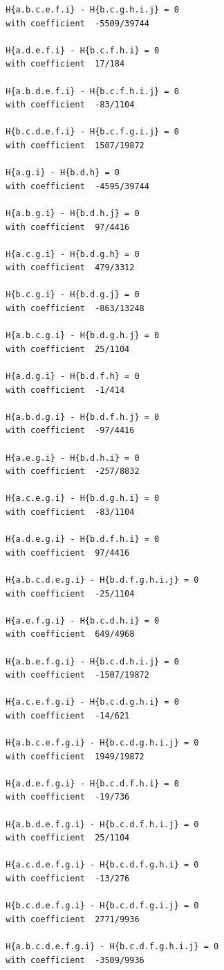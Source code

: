 \documentclass[11pt, a4paper]{kybernetika}
\begin{document}
\begin{verbatim}
		H{a.b.c.e.f.i} - H{b.c.g.h.i.j} = 0
		with coefficient  -5509/39744
		
		H{a.d.e.f.i} - H{b.c.f.h.i} = 0
		with coefficient  17/184
		
		H{a.b.d.e.f.i} - H{b.c.f.h.i.j} = 0
		with coefficient  -83/1104
		
		H{b.c.d.e.f.i} - H{b.c.f.g.i.j} = 0
		with coefficient  1507/19872
		
		H{a.g.i} - H{b.d.h} = 0
		with coefficient  -4595/39744
		
		H{a.b.g.i} - H{b.d.h.j} = 0
		with coefficient  97/4416
		
		H{a.c.g.i} - H{b.d.g.h} = 0
		with coefficient  479/3312
		
		H{b.c.g.i} - H{b.d.g.j} = 0
		with coefficient  -863/13248
		
		H{a.b.c.g.i} - H{b.d.g.h.j} = 0
		with coefficient  25/1104
		
		H{a.d.g.i} - H{b.d.f.h} = 0
		with coefficient  -1/414
		
		H{a.b.d.g.i} - H{b.d.f.h.j} = 0
		with coefficient  -97/4416
		
		H{a.e.g.i} - H{b.d.h.i} = 0
		with coefficient  -257/8832
		
		H{a.c.e.g.i} - H{b.d.g.h.i} = 0
		with coefficient  -83/1104
		
		H{a.d.e.g.i} - H{b.d.f.h.i} = 0
		with coefficient  97/4416
		
		H{a.b.c.d.e.g.i} - H{b.d.f.g.h.i.j} = 0
		with coefficient  -25/1104
		
		H{a.e.f.g.i} - H{b.c.d.h.i} = 0
		with coefficient  649/4968
		
		H{a.b.e.f.g.i} - H{b.c.d.h.i.j} = 0
		with coefficient  -1507/19872
		
		H{a.c.e.f.g.i} - H{b.c.d.g.h.i} = 0
		with coefficient  -14/621
		
		H{a.b.c.e.f.g.i} - H{b.c.d.g.h.i.j} = 0
		with coefficient  1949/19872
		
		H{a.d.e.f.g.i} - H{b.c.d.f.h.i} = 0
		with coefficient  -19/736
		
		H{a.b.d.e.f.g.i} - H{b.c.d.f.h.i.j} = 0
		with coefficient  25/1104
		
		H{a.c.d.e.f.g.i} - H{b.c.d.f.g.h.i} = 0
		with coefficient  -13/276
		
		H{b.c.d.e.f.g.i} - H{b.c.d.f.g.i.j} = 0
		with coefficient  2771/9936
		
		H{a.b.c.d.e.f.g.i} - H{b.c.d.f.g.h.i.j} = 0
		with coefficient  -3509/9936
		

\end{verbatim}
\end{document}
